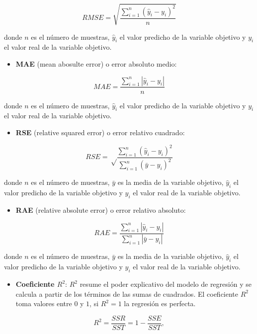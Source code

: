 \documentclass[]{book}
\providecommand{\tightlist}{%
  \setlength{\itemsep}{0pt}\setlength{\parskip}{0pt}}
\begin{document}
\[RMSE = \sqrt {\frac{\sum_{i=1}^{n} (\hat{y}_i - y_i)^2}{n}}\]

donde \(n\) es el número de muestras, \(\hat{y}_i\) el valor predicho de la variable objetivo y \(y_i\) el valor real de la variable objetivo.

\begin{itemize}
\tightlist
\item
  \textbf{MAE} (mean abosulte error) o error absoluto medio:
\end{itemize}

\[MAE = \frac{\sum_{i=1}^{n} | \hat{y}_i - y_i |}{n}\]

donde \(n\) es el número de muestras, \(\hat{y}_i\) el valor predicho de la variable objetivo y \(y_i\) el valor real de la variable objetivo.

\begin{itemize}
\tightlist
\item
  \textbf{RSE} (relative squared error) o error relativo cuadrado:
\end{itemize}

\[RSE = \sqrt \frac{\sum_{i=1}^{n} (\hat{y}_i - y_i)^2}{\sum_{i=1}^{n} (\bar{y} - y_i)^2}\]

donde \(n\) es el número de muestras, \(\bar{y}\) es la media de la variable objetivo, \(\hat{y}_i\) el valor predicho de la variable objetivo y \(y_i\) el valor real de la variable objetivo.

\begin{itemize}
\tightlist
\item
  \textbf{RAE} (relative absolute error) o error relativo absoluto:
\end{itemize}

\[RAE = \frac{\sum_{i=1}^{n} |\hat{y}_i - y_i|}{\sum_{i=1}^{n} |\bar{y} - y_i|}\]

donde \(n\) es el número de muestras, \(\bar{y}\) es la media de la variable objetivo, \(\hat{y}_i\) el valor predicho de la variable objetivo y \(y_i\) el valor real de la variable objetivo.

\begin{itemize}
\tightlist
\item
  \textbf{Coeficiente \(R^2\)}: \(R^2\) resume el poder explicativo del modelo de regresión y se calcula a partir de los términos de las sumas de cuadrados. El coeficiente \(R^2\) toma valores entre \(0\) y \(1\), si \(R^2=1\) la regresión es perfecta.
\end{itemize}

\[R^2 = \frac {SSR}{SST} = 1 - \frac{SSE}{SST}, \]
\end{document}
